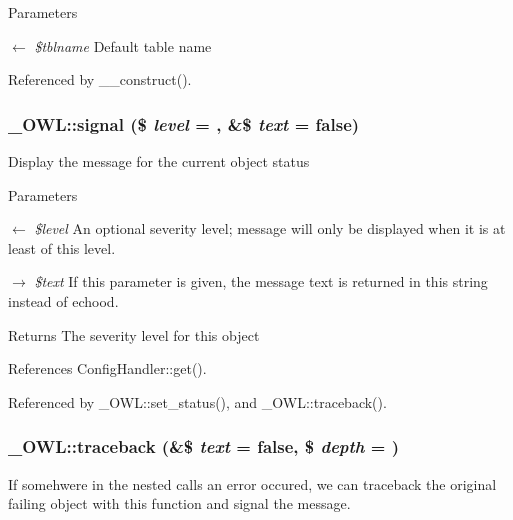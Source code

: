 \begin{DoxyParams}{Parameters}
\item[\mbox{$\leftarrow$} {\em \$tblname}]Default table name \end{DoxyParams}


Referenced by \_\-\_\-construct().

\subsubsection[{signal}]{\setlength{\rightskip}{0pt plus 5cm}\_\-OWL::signal (\$ {\em level} = {}, \/  \&\$ {\em text} = {\ttfamily false})}\label{class__OWL_a51ba4a16409acf2a2f61f286939091a5}
Display the message for the current object status


\begin{DoxyParams}{Parameters}
\item[\mbox{$\leftarrow$} {\em \$level}]An optional severity level; message will only be displayed when it is at least of this level. \item[\mbox{$\rightarrow$} {\em \$text}]If this parameter is given, the message text is returned in this string instead of echood. \end{DoxyParams}
\begin{DoxyReturn}{Returns}
The severity level for this object 
\end{DoxyReturn}


References ConfigHandler::get().



Referenced by \_\-OWL::set\_\-status(), and \_\-OWL::traceback().

\subsubsection[{traceback}]{\setlength{\rightskip}{0pt plus 5cm}\_\-OWL::traceback (\&\$ {\em text} = {\ttfamily false}, \/  \$ {\em depth} = {})}\label{class__OWL_aa29547995d6741b7d2b90c1d4ea99a13}
If somehwere in the nested calls an error occured, we can traceback the original failing object with this function and signal the message.


